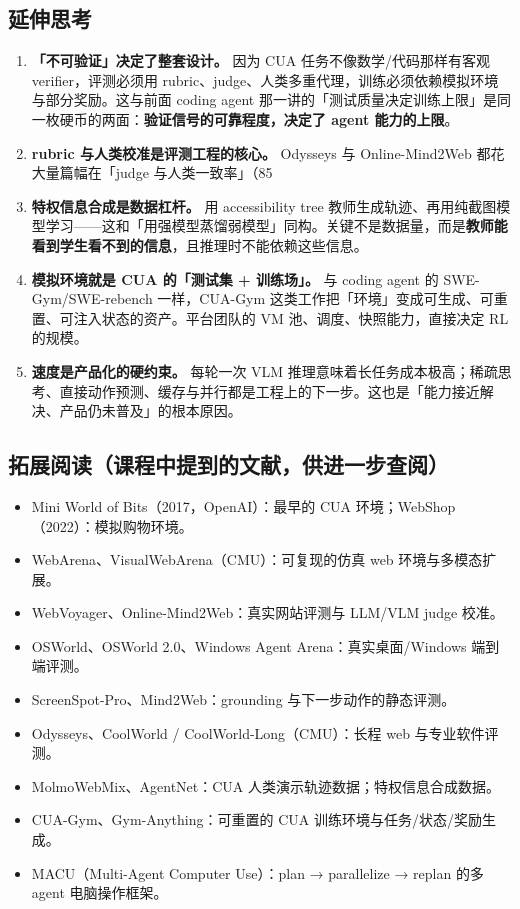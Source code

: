 ﻿\documentclass[a4paper]{article}
\begin{document}
\subsection{延伸思考}

\begin{enumerate}
\item \textbf{「不可验证」决定了整套设计。} 因为 CUA 任务不像数学/代码那样有客观 verifier，评测必须用 rubric、judge、人类多重代理，训练必须依赖模拟环境与部分奖励。这与前面 coding agent 那一讲的「测试质量决定训练上限」是同一枚硬币的两面：\textbf{验证信号的可靠程度，决定了 agent 能力的上限}。
\item \textbf{rubric 与人类校准是评测工程的核心。} Odysseys 与 Online-Mind2Web 都花大量篇幅在「judge 与人类一致率」（85%
\item \textbf{特权信息合成是数据杠杆。} 用 accessibility tree 教师生成轨迹、再用纯截图模型学习——这和「用强模型蒸馏弱模型」同构。关键不是数据量，而是\textbf{教师能看到学生看不到的信息}，且推理时不能依赖这些信息。
\item \textbf{模拟环境就是 CUA 的「测试集 + 训练场」。} 与 coding agent 的 SWE-Gym/SWE-rebench 一样，CUA-Gym 这类工作把「环境」变成可生成、可重置、可注入状态的资产。平台团队的 VM 池、调度、快照能力，直接决定 RL 的规模。
\item \textbf{速度是产品化的硬约束。} 每轮一次 VLM 推理意味着长任务成本极高；稀疏思考、直接动作预测、缓存与并行都是工程上的下一步。这也是「能力接近解决、产品仍未普及」的根本原因。
\end{enumerate}

\subsection{拓展阅读（课程中提到的文献，供进一步查阅）}

\begin{itemize}
\item Mini World of Bits（2017，OpenAI）：最早的 CUA 环境；WebShop（2022）：模拟购物环境。
\item WebArena、VisualWebArena（CMU）：可复现的仿真 web 环境与多模态扩展。
\item WebVoyager、Online-Mind2Web：真实网站评测与 LLM/VLM judge 校准。
\item OSWorld、OSWorld 2.0、Windows Agent Arena：真实桌面/Windows 端到端评测。
\item ScreenSpot-Pro、Mind2Web：grounding 与下一步动作的静态评测。
\item Odysseys、CoolWorld / CoolWorld-Long（CMU）：长程 web 与专业软件评测。
\item MolmoWebMix、AgentNet：CUA 人类演示轨迹数据；特权信息合成数据。
\item CUA-Gym、Gym-Anything：可重置的 CUA 训练环境与任务/状态/奖励生成。
\item MACU（Multi-Agent Computer Use）：plan → parallelize → replan 的多 agent 电脑操作框架。
\end{itemize}
\end{document}
